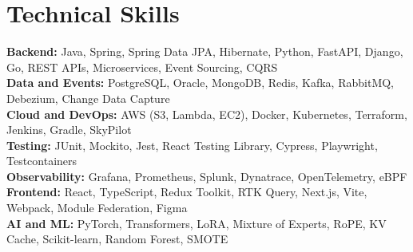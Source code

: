 \documentclass[a4paper,10pt]{article}
\begin{document}
\section{Technical Skills}
{\small
    \textbf{Backend:} Java, Spring, Spring Data JPA, Hibernate, Python, FastAPI, Django, Go, REST APIs, Microservices, Event Sourcing, CQRS \\
    \textbf{Data and Events:} PostgreSQL, Oracle, MongoDB, Redis, Kafka, RabbitMQ, Debezium, Change Data Capture \\
    \textbf{Cloud and DevOps:} AWS (S3, Lambda, EC2), Docker, Kubernetes, Terraform, Jenkins, Gradle, SkyPilot \\
    \textbf{Testing:} JUnit, Mockito, Jest, React Testing Library, Cypress, Playwright, Testcontainers \\
    \textbf{Observability:} Grafana, Prometheus, Splunk, Dynatrace, OpenTelemetry, eBPF \\
    \textbf{Frontend:} React, TypeScript, Redux Toolkit, RTK Query, Next.js, Vite, Webpack, Module Federation, Figma \\
    \textbf{AI and ML:} PyTorch, Transformers, LoRA, Mixture of Experts, RoPE, KV Cache, Scikit-learn, Random Forest, SMOTE \\
}
\end{document}
